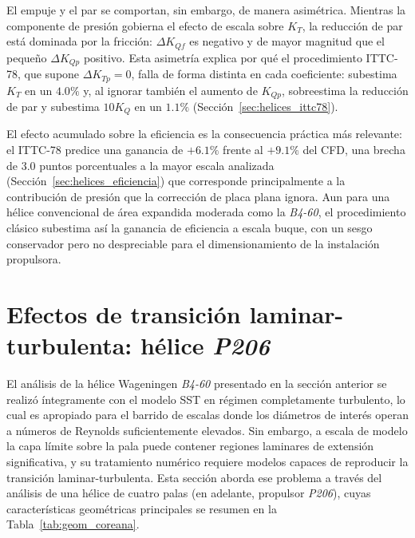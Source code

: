 El empuje y el par se comportan, sin embargo, de manera asimétrica. Mientras la
componente de presión gobierna el efecto de escala sobre $K_T$, la reducción de par
está dominada por la fricción: $\Delta K_{Qf}$ es negativo y de mayor magnitud que el
pequeño $\Delta K_{Qp}$ positivo. Esta asimetría explica por qué el procedimiento
ITTC-78, que supone $\Delta K_{Tp}=0$, falla de forma distinta en cada coeficiente:
subestima $K_T$ en un $4.0\%$ y, al ignorar también el aumento de $K_{Qp}$, sobreestima
la reducción de par y subestima $10K_Q$ en un $1.1\%$
(Sección~\ref{sec:helices_ittc78}).

El efecto acumulado sobre la eficiencia es la consecuencia práctica más relevante: el
ITTC-78 predice una ganancia de $+6.1\%$ frente al $+9.1\%$ del CFD, una brecha
de $3.0$ puntos porcentuales a la mayor escala analizada (Sección~\ref{sec:helices_eficiencia}) que
corresponde principalmente a la contribución de presión que la corrección de placa plana
ignora. Aun para una hélice convencional de área expandida moderada como la \textit{B4-60}, el
procedimiento clásico subestima así la ganancia de eficiencia a escala buque, con un
sesgo conservador pero no despreciable para el dimensionamiento de la instalación
propulsora.


\section{Efectos de transición laminar-turbulenta: hélice \textit{P206}}
\label{sec:helice_coreana}

El análisis de la hélice Wageningen \textit{B4-60} presentado en la sección anterior se realizó
íntegramente con el modelo SST en régimen completamente turbulento, lo cual es apropiado
para el barrido de escalas donde los diámetros de interés operan a números de Reynolds
suficientemente elevados. Sin embargo, a escala de modelo la capa límite sobre la pala
puede contener regiones laminares de extensión significativa, y su tratamiento numérico
requiere modelos capaces de reproducir la transición laminar-turbulenta. Esta sección
aborda ese problema a través del análisis de una hélice de cuatro palas (en adelante,
propulsor \textit{P206}), cuyas
características geométricas principales se resumen en la
Tabla~\ref{tab:geom_coreana}.

